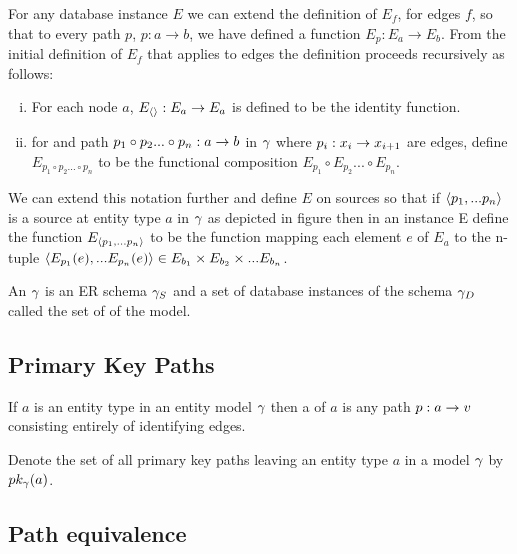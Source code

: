 \noindent For any database instance $E$ we can  extend  the definition of
$E_f$, for edges $f$,  so that to every path $p$, $p: a \rightarrow b$,  we have defined a function $E_p: E_a \rightarrow E_b$. From the initial definition of $E_f$ that applies to 
edges the definition proceeds recursively as follows: 
\begin{enumerate} [(i)]
\item{
For each node $a$, $E_{\langle\rangle}: E_a \rightarrow E_a$ is defined to be the identity function.
}
\item for and path $p_1 \circ p_2... \circ p_n: a \rightarrow b$ in $\gamma$ where $p_i: x_i \rightarrow x_{i+1}$ are edges,
define $E_{p_1 \circ p_2... \circ p_n}$ to be the functional composition $E_{p_1} \circ E_{p_2}... \circ E_{p_n}$.
\end{enumerate}

We can extend this notation further and define $E$ on sources so that if 
$\langle p_1,...p_n\rangle$ is a source at entity type $a$ in $\gamma$ as depicted in figure  then in an instance E
define the function  $E_{\langle p_1,...p_n\rangle}$  to be the function mapping each element $e$ 
of $E_a$ to the n-tuple
$\langle E_{p_1}(e),...E_{p_n}(e)\rangle \in E_{b_1} \times E_{b_2} \times ... E_{b_n}$.

\begin{definition}
\noindent An  $\gamma$ is an ER schema $\gamma_S$ and a set of database instances of the schema $\gamma_D$ called the set of
 of the model. \\
\end{definition}

\subsection{Primary Key Paths}
\begin{definition}
If $a$ is an entity type in an entity model $\gamma$ then a 
of $a$ is any path $p:a \rightarrow v$ consisting entirely of identifying edges. 
\end{definition}

Denote the set of all primary key paths leaving an entity type $a$ in a model $\gamma$ by 
$pk_{\gamma}(a)$.

\subsection{Path equivalence}

